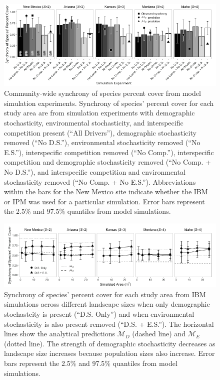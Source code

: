 \documentclass[12pt,]{article}
\begin{document}
\pagebreak{}

\begin{figure}[!ht]
  \centering
      \includegraphics[width=6in]{./components/formatted_figures/formatted_figureS2.png}
  \caption{Community-wide synchrony of species percent cover from model simulation experiments. Synchrony of species' percent cover for each study area are from simulation experiments with demographic stochasticity, environmental stochasticity, and interspecific competition present (``All Drivers''), demographic stochasticity removed (``No D.S.''), environmental stochasticity removed (``No E.S.''), interspecific competition removed (``No Comp.''), interspecific competition and demographic stochasticity removed (``No Comp. + No D.S.''), and interspecific competition and environmental stochasticity removed (``No Comp. + No E.S.''). Abbreviations within the bars for the New Mexico site indicate whether the IBM or IPM was used for a particular simulation. Error bars represent the 2.5\% and 97.5\% quantiles from model simulations.}
\end{figure}

\pagebreak{}

\begin{figure}[!ht]
  \centering
      \includegraphics[width=6in]{./components/formatted_figures/formatted_figureS3.png}
  \caption{Synchrony of species' percent cover for each study area from IBM simulations across different landscape sizes when only demographic stochastcity is present (``D.S. Only'') and when environmental stochasticity is also present removed (``D.S. + E.S.''). The horizontal lines show the analytical predictions $\mathcal{M}_D$ (dashed line) and $\mathcal{M}_E$ (dotted line). The strength of demographic stochasticity decreases as landscape size increases because population sizes also increase. Error bars represent the 2.5\% and 97.5\% quantiles from model simulations.}
\end{figure}
\end{document}
